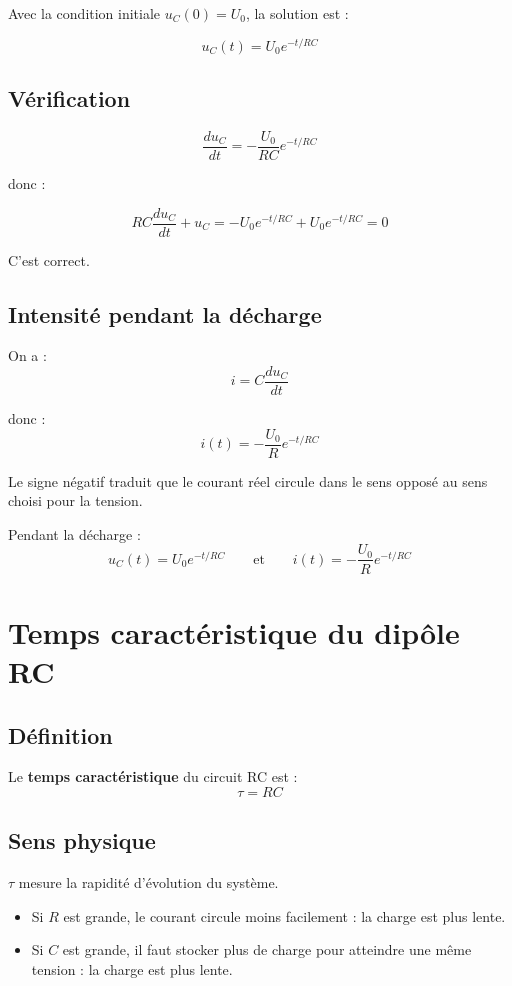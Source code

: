 \documentclass[11pt,a4paper]{article}
\begin{document}
Avec la condition initiale \(u_C(0)=U_0\), la solution est :

\[
u_C(t)=U_0 e^{-t/RC}
\]

\subsection{Vérification}

\[
\frac{du_C}{dt} = -\frac{U_0}{RC}e^{-t/RC}
\]

donc :

\[
RC\frac{du_C}{dt} + u_C = -U_0e^{-t/RC}+U_0e^{-t/RC}=0
\]

C'est correct.

\subsection{Intensité pendant la décharge}

On a :
\[
i = C\frac{du_C}{dt}
\]

donc :
\[
i(t)= -\frac{U_0}{R}e^{-t/RC}
\]

Le signe négatif traduit que le courant réel circule dans le sens opposé au sens choisi pour la tension.

\begin{propriete}
Pendant la décharge :
\[
u_C(t)=U_0 e^{-t/RC}
\qquad \text{et} \qquad
i(t)= -\frac{U_0}{R}e^{-t/RC}
\]
\end{propriete}

\section{Temps caractéristique du dipôle RC}

\subsection{Définition}

\begin{definitionbox}
Le \textbf{temps caractéristique} du circuit RC est :
\[
\tau = RC
\]
\end{definitionbox}

\subsection{Sens physique}

\(\tau\) mesure la rapidité d'évolution du système.

\begin{itemize}
    \item Si \(R\) est grande, le courant circule moins facilement : la charge est plus lente.
    \item Si \(C\) est grande, il faut stocker plus de charge pour atteindre une même tension : la charge est plus lente.
\end{itemize}
\end{document}
